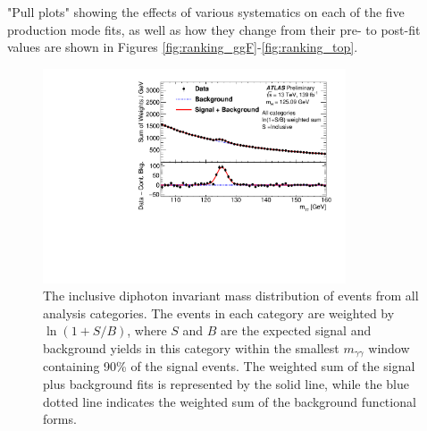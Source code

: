 "Pull plots" showing the effects of various systematics on each of the five production mode fits, as well as how they change from their pre- to post-fit values are shown in Figures \ref{fig:ranking_ggF}-\ref{fig:ranking_top}.

\begin{figure}
    \centering
    \includegraphics[width=0.8\textwidth]{figures/couplings_chapter/weighted_coupling2020_all.pdf}
    \caption{The inclusive diphoton invariant mass distribution of events from all analysis categories. The events in each category are weighted by $\ln(1+S/B)$, where $S$ and $B$ are the expected signal and background yields in this category within the smallest $m_{\gamma \gamma}$ window containing 90\% of the signal events. The weighted sum of the signal plus background fits is represented by the solid line, while the blue dotted line indicates the weighted sum of the background functional forms. }
    \label{fig:result:inclusivemgg}
\end{figure}

